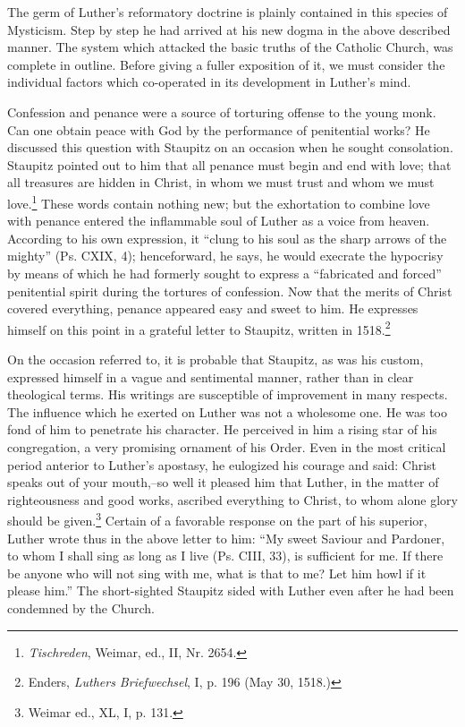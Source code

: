 The germ of Luther’s reformatory doctrine is plainly contained
in this species of Mysticism. Step by step he had arrived at his new
dogma in the above described manner. The system which attacked
the basic truths of the Catholic Church, was complete in outline.
Before giving a fuller exposition of it, we must consider the individual
factors which co-operated in its development in Luther’s mind.

Confession and penance were a source of torturing offense to the
young monk. Can one obtain peace with God by the performance
of penitential works? He discussed this question with Staupitz on an
occasion when he sought consolation. Staupitz pointed out to him that
all penance must begin and end with love; that all treasures are
hidden in Christ, in whom we must trust and whom we must love.\footnote
{\textit{Tischreden}, Weimar, ed., II, Nr. 2654.}
These words contain nothing new; but the exhortation to combine
love with penance entered the inflammable soul of Luther as a voice
from heaven. According to his own expression, it “clung to his soul
as the sharp arrows of the mighty” (Ps. CXIX, 4); henceforward,
he says, he would execrate the hypocrisy by means of which he had
formerly sought to express a “fabricated and forced” penitential
spirit during the tortures of confession. Now that the merits
of Christ covered everything, penance appeared easy and sweet
to him. He expresses himself on this point in a grateful letter to
Staupitz, written in 1518.\footnote
{Enders, \textit{Luthers Briefwechsel}, I, p. 196 (May 30, 1518.)}

On the occasion referred to, it is probable that Staupitz, as was
his custom, expressed himself in a vague and sentimental manner,
rather than in clear theological terms. His writings are susceptible of
improvement in many respects. The influence which he exerted on
Luther was not a wholesome one. He was too fond of him to penetrate
his character. He perceived in him a rising star of his congregation,
a very promising ornament of his Order. Even in the most
critical period anterior to Luther’s apostasy, he eulogized his courage
and said: Christ speaks out of your mouth,--so well it pleased him
that Luther, in the matter of righteousness and good works, ascribed
everything to Christ, to whom alone glory should be given.\footnote{Weimar ed., XL, I, p. 131.}
Certain of a favorable response on the part of his superior, Luther wrote thus
in the above letter to him: “My sweet Saviour and Pardoner, to whom I
shall sing as long as I live (Ps. CIII, 33), is sufficient for me. If there
be anyone who will not sing with me, what is that to me? Let him
howl if it please him.” The short-sighted Staupitz sided with Luther
even after he had been condemned by the Church.


